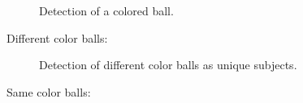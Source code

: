 \documentclass{sciposter}
\begin{document}
\begin{multicols}{3}
\begin{figure}[!h]
	\centering
			\setlength{\fboxsep}{1pt}
			\setlength{\fboxrule}{1pt}
	\caption{Detection of a colored ball.}
	\label{fig:single_color}
\end{figure}

Different color balls:

\begin{figure}[!h]
	\centering
			\setlength{\fboxsep}{1pt}
			\setlength{\fboxrule}{1pt}
	\caption{Detection of different color balls as unique subjects.}
	\label{fig:diff_color}
\end{figure}

Same color balls:


\end{multicols}
\end{document}
